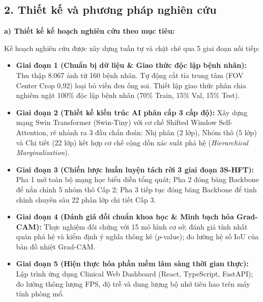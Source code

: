 \documentclass[a4paper]{article}
\begin{document}
\subsection*{2. Thiết kế và phương pháp nghiên cứu}

\noindent\textbf{a) Thiết kế kế hoạch nghiên cứu theo mục tiêu:}

Kế hoạch nghiên cứu được xây dựng tuần tự và chặt chẽ qua 5 giai đoạn nối tiếp:
\begin{itemize}
  \item \textbf{Giai đoạn 1 (Chuẩn bị dữ liệu \& Giao thức độc lập bệnh nhân):} Thu thập 8.067 ảnh từ 160 bệnh nhân. Tự động cắt tỉa trung tâm (FOV Center Crop 0,92) loại bỏ viền đen ống soi. Thiết lập giao thức phân chia nghiêm ngặt 100\% độc lập bệnh nhân (70\% Train, 15\% Val, 15\% Test).
  \item \textbf{Giai đoạn 2 (Thiết kế kiến trúc AI phân cấp 3 cấp độ):} Xây dựng mạng Swin Transformer (Swin-Tiny) với cơ chế Shifted Window Self-Attention, rẽ nhánh ra 3 đầu chẩn đoán: Nhị phân (2 lớp), Nhóm thô (5 lớp) và Chi tiết (22 lớp) kết hợp cơ chế cộng dồn xác suất phả hệ (\textit{Hierarchical Marginalization}).
  \item \textbf{Giai đoạn 3 (Chiến lược huấn luyện tách rời 3 giai đoạn 3S-HFT):} Pha 1 mở toàn bộ mạng học biểu diễn tổng quát; Pha 2 đóng băng Backbone để nắn chỉnh 5 nhóm thô Cấp 2; Pha 3 tiếp tục đóng băng Backbone để tinh chỉnh chuyên sâu 22 phân lớp chi tiết Cấp 3.
  \item \textbf{Giai đoạn 4 (Đánh giá đối chuẩn khoa học \& Minh bạch hóa Grad-CAM):} Thực nghiệm đối chứng với 15 mô hình cơ sở; đánh giá tính nhất quán phả hệ và kiểm định ý nghĩa thống kê ($p$-value); đo lường hệ số IoU của bản đồ nhiệt Grad-CAM.
  \item \textbf{Giai đoạn 5 (Hiện thực hóa phần mềm lâm sàng thời gian thực):} Lập trình ứng dụng Clinical Web Dashboard (React, TypeScript, FastAPI); đo lường thông lượng FPS, độ trễ và dung lượng bộ nhớ tiêu hao trên máy tính phòng mổ.
\end{itemize}
\end{document}
